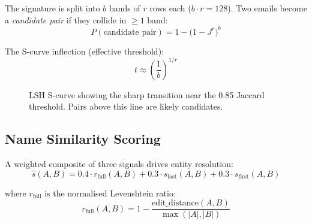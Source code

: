 \documentclass[11pt,a4paper]{article}
\begin{document}
The signature is split into $b$ bands of $r$ rows each ($b \cdot r = 128$).
Two emails become a \emph{candidate pair} if they collide in $\geq 1$ band:
\begin{equation}
  P(\text{candidate pair}) = 1 - \bigl(1 - J^r\bigr)^b
\end{equation}

The S-curve inflection (effective threshold):
\begin{equation}
  t \approx \left(\frac{1}{b}\right)^{1/r}
\end{equation}

\begin{figure}[H]
\centering
{}
\caption{LSH S-curve showing the sharp transition near the 0.85 Jaccard
  threshold.  Pairs above this line are likely candidates.}
\end{figure}

\subsection{Name Similarity Scoring}

A weighted composite of three signals drives entity resolution:
\begin{equation}
  \boxed{\hat{s}(A,B) = 0.4\cdot r_\text{full}(A,B)
                       + 0.3\cdot s_\text{last}(A,B)
                       + 0.3\cdot s_\text{first}(A,B)}
\end{equation}

where $r_\text{full}$ is the normalised Levenshtein ratio:
\begin{equation}
  r_\text{full}(A,B)
    = 1 - \frac{\mathrm{edit\_distance}(A,B)}{\max(|A|,|B|)}
\end{equation}
\end{document}
